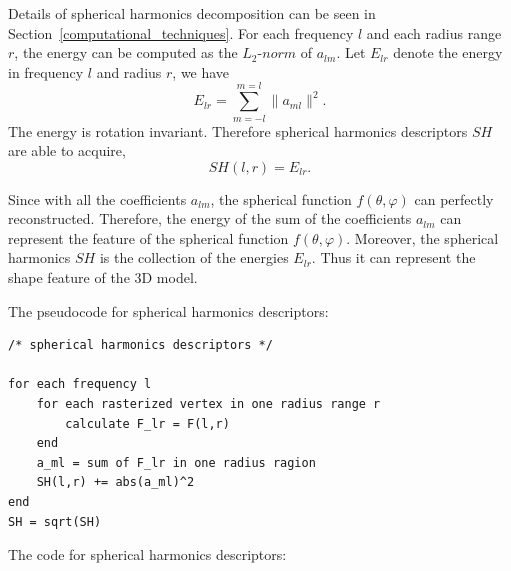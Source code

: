 Details of spherical harmonics decomposition can be seen in Section~\ref{computational_techniques}. For each frequency $l$ and each radius range $r$, the energy can be computed as the $L_{2}$-$norm$ of $a_{lm}$. Let $E_{lr}$ denote the energy in frequency $l$ and radius $r$, we have
\begin{equation}
E_{lr}=\sum_{m=-l}^{m=l}\|a_{ml}\|^{2}.
\end{equation}
The energy is rotation invariant. Therefore spherical harmonics descriptors $SH$ are able to acquire,
\begin{equation}
SH(l,r) = E_{lr}.
\end{equation}

Since with all the coefficients $a_{lm}$, the spherical function $f(\theta,\varphi)$ can perfectly reconstructed. Therefore, the energy of the sum of the coefficients $a_{lm}$ can represent the feature of the spherical function $f(\theta,\varphi)$. Moreover, the spherical harmonics $SH$ is the collection of the energies $E_{lr}$. Thus it can represent the shape feature of the 3D model. 

The pseudocode for spherical harmonics descriptors:

\begin{lstlisting}[xleftmargin=0em]
/* spherical harmonics descriptors */

for each frequency l
    for each rasterized vertex in one radius range r 
        calculate F_lr = F(l,r)
    end
    a_ml = sum of F_lr in one radius ragion
    SH(l,r) += abs(a_ml)^2    
end
SH = sqrt(SH)
\end{lstlisting}

The code for spherical harmonics descriptors:

